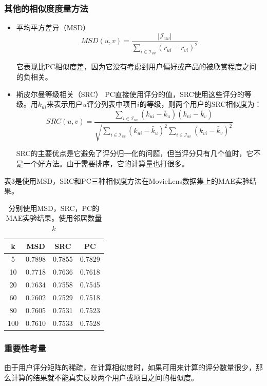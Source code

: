 \documentclass{article}
\begin{document}
 \subsubsection{其他的相似度度量方法}
 \begin{itemize}
 \item 平均平方差异（MSD）
 $$ MSD(u,v)=\frac{|\mathcal{I}_{uv}|}{\mathop{\sum}\limits_{i\in\mathcal{I}_{uv}}(r_{ui}-r_{vi})^2} $$

 它表现比PC相似度差，因为它没有考虑到用户偏好或产品的被欣赏程度之间的负相关。

 \item 斯皮尔曼等级相关（SRC）
 PC直接使用评分的值，SRC使用这些评分的等级。用$k_{ui}$来表示用户$u$评分列表中项目$i$的等级，则两个用户的SRC相似度为：
 $$ SRC(u,v)=\frac{\mathop{\sum}\limits_{i\in\mathcal{I}_{uv}}(k_{ui}-\bar{k}_{u})(k_{vi}-\bar{k}_{v})}{\sqrt{\mathop{\sum}\limits_{i\in\mathcal{I}_{uv}}(k_{ui}-\bar{k}_{u})^2\mathop{\sum}\limits_{i\in\mathcal{I}_{uv}}(k_{vi}-\bar{k}_{v})^2}} $$

 SRC的主要优点是它避免了评分归一化的问题，但当评分只有几个值时，它不是一个好方法。由于需要排序，它的计算量也打很多。
 \end{itemize}

 表3是使用MSD，SRC和PC三种相似度方法在MovieLens数据集上的MAE实验结果。
 \begin{table}[!htb]
 	\centering
 	\caption{分别使用MSD，SRC，PC的MAE实验结果。使用邻居数量$k$}
 	\begin{tabular}{c||c|c|c}\hline
 	k  &   MSD  & SRC & PC \\ \hline\hline
 	5 & 0.7898 & 0.7855 & 0.7829\\ \hline
 	10 & 0.7718 & 0.7636 & 0.7618\\ \hline
 	20 & 0.7634 & 0.7558 & 0.7545\\ \hline
 	60 & 0.7602 & 0.7529 & 0.7518\\ \hline
 	80 & 0.7605 & 0.7531 & 0.7523\\ \hline
 	100 & 0.7610 & 0.7533 & 0.7528\\ \hline
 	\end{tabular}
 \end{table}

 \subsubsection{重要性考量}
 由于用户评分矩阵的稀疏，在计算相似度时，如果可用来计算的评分数量很少，那么计算的结果就不能真实反映两个用户或项目之间的相似度。
\end{document}
